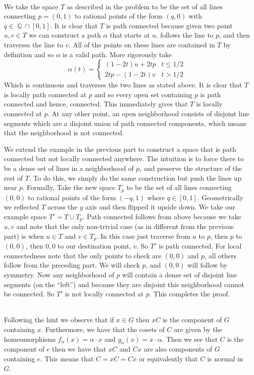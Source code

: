 \documentclass{article}
\DeclareMathOperator{\Q}{\mathbb{Q}}
\newcommand{\problem}[1]{\noindent{\textbf{Problem #1}}\\}
\newcommand{\problempart}[1]{\noindent{\textbf{(#1)}}}
\begin{document}
\problem{3.25.5}
\problempart{a} We take the space $T$ as described in the problem to be the set of all lines connecting $p = (0,1)$ to rational points of the form $(q,0)$ with $q \in \Q \cap [0,1]$. It is clear that $T$ is path connected because given two point $u,v \in T$ we can construct a path $\alpha$ that starts at $u$, follows the line to $p$, and then traverses the line to $v$. All of the points on these lines are contained in $T$ by definition and so $\alpha$ is a valid path. More rigorously take
\[
\alpha(t) = \begin{cases}
(1-2t)u + 2tp & t \leq 1/2 \\
2tp - (1-2t)v  & t > 1/2
\end{cases}
\]
Which is continuous and traverses the two lines as stated above. It is clear that $T$ is locally path connected at $p$ and so every open set containing $p$ is path connected and hence, connected. This immediately gives that $T$ is locally connected at $p$. At any other point, an open neighborhood consists of disjoint line segments which are a disjoint union of path connected components, which means that the neighborhood is not connected. 

\problempart{b} We extend the example in the previous part to construct a space that is path connected but not locally connected anywhere. The intuition is to force there to be a dense set of lines in a neighborhood of $p$, and preserve the structure of the rest of $T$. To do this, we simply do the same construction but push the lines up near $p$. Formally, Take the new space $T_p$ to be the set of all lines connecting $(0,0)$ to rational points of the form $(-q,1)$ where $q \in [0,1]$. Geometrically we reflected $T$ across the $y$ axis and then flipped it upside down. We take our example space $T' = T \cup T_p$. Path connected follows from above because we take $u,v$ and note that the only non-trivial case (as in different from the previous part) is when $u \in T$ and $v \in T_p$. In this case just traverse from $u$ to $p$, then $p$ to $(0,0)$, then $0,0$ to our destination point, $v$. So $T'$ is path connected. For local connectedness note that the only points to check are $(0,0)$ and $p$, all others follow from the preceding part. We will check $p$, and $(0,0)$ will follow by symmetry. Now any neighborhood of $p$ will contain a dense set of disjoint line segments (on the ``left'') and because they are disjoint this neighborhood cannot be connected. So $T'$ is not locally connected at $p$. This completes the proof.  

\problem{3.25.9} Following the hint we observe that if $x \in G$ then $xC$ is the component of $G$ containing $x$. Furthermore, we have that the cosets of $C$ are given by the homeomorphisms $f_\alpha(x) = \alpha \cdot x$ and $g_\alpha(x) = x\cdot \alpha$. Then we see that $C$ is the component of $e$ then we have that $xC$ and $Cx$ are also components of $G$ containing $e$. This means that $C = xC = Cx$ or equivalently that $C$ is normal in $G$. 
\end{document}
